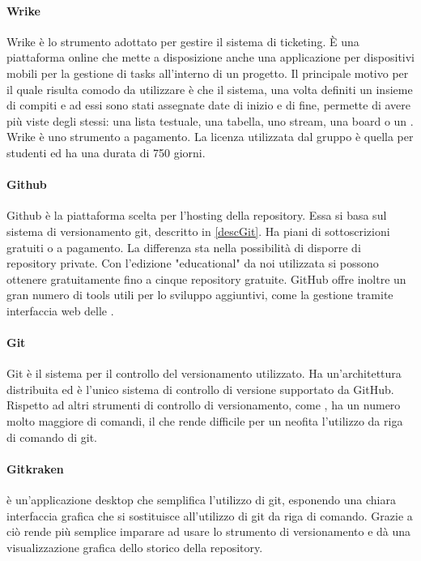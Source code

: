 \paragraph{Wrike} \Spazio
Wrike è lo strumento adottato per gestire il sistema di ticketing. È una piattaforma online che mette a disposizione anche una applicazione per dispositivi mobili per la gestione di tasks all'interno di un progetto. Il principale motivo per il quale risulta comodo da utilizzare è che il sistema, una volta definiti un insieme di compiti e ad essi sono stati  assegnate date di inizio e di fine, permette di avere più viste degli stessi: una lista testuale, una tabella, uno stream, una board o un . \\ Wrike è uno strumento a pagamento. La licenza utilizzata dal gruppo è quella per studenti ed ha una durata di 750 giorni.

\paragraph{Github} \Spazio
Github è la piattaforma scelta per l'hosting della repository. Essa si basa sul sistema di versionamento git, descritto in \ref{descGit}. Ha piani di sottoscrizioni gratuiti o a pagamento. La differenza sta nella possibilità di disporre di repository private. Con l'edizione "educational" da noi utilizzata si possono ottenere gratuitamente fino a cinque repository gratuite. GitHub offre inoltre un gran numero di tools utili per lo sviluppo aggiuntivi, come la gestione tramite interfaccia web delle .

\paragraph{Git} \Spazio
Git\label{descGit} è il sistema per il controllo del versionamento utilizzato. Ha un'architettura distribuita ed è l'unico sistema di controllo di versione supportato da GitHub. Rispetto ad altri strumenti di controllo di versionamento, come , ha un numero molto maggiore di comandi, il che rende difficile per un neofita l'utilizzo da riga di comando di git.

\paragraph{Gitkraken} \Spazio
{} è un'applicazione desktop  che semplifica l'utilizzo di git, esponendo una chiara interfaccia grafica che si sostituisce all'utilizzo di git da riga di comando. Grazie a ciò rende più semplice imparare ad usare lo strumento di versionamento e dà una visualizzazione grafica dello storico della repository.

